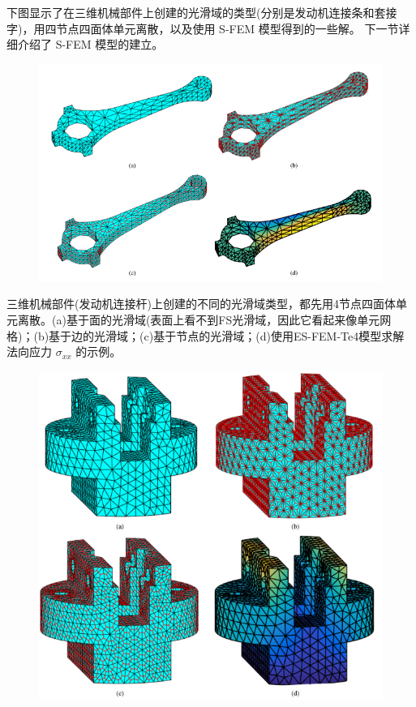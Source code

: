 \documentclass[12pt,a4paper]{article}
\begin{document}
下图显示了在三维机械部件上创建的光滑域的类型(分别是发动机连接条和套接字)，用四节点四面体单元离散，以及使用 S-FEM 模型得到的一些解。
下一节详细介绍了 S-FEM 模型的建立。
\begin{figure}[H]
\centering
\includegraphics[scale=0.5]{./figures/8.png}
\caption{}
\end{figure}
		
三维机械部件(发动机连接杆)上创建的不同的光滑域类型，都先用4节点四面体单元离散。(a)基于面的光滑域(表面上看不到FS光滑域，因此它看起来像单元网格)；(b)基于边的光滑域；(c)基于节点的光滑域；(d)使用ES-FEM-Te4模型求解法向应力 $\sigma _{xx}$ 的示例。

\begin{figure}[H]
\centering
\includegraphics[scale=0.5]{./figures/9.png}
\caption{}
\end{figure}
\end{document}
